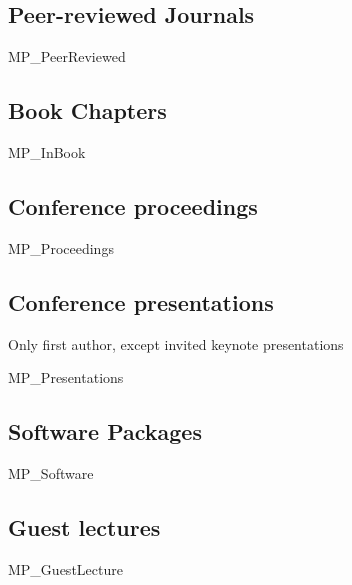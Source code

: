 \documentclass[a4paper]{article}
\begin{document}
\subsection{Peer-reviewed Journals}

\begin{btSect}{MP_PeerReviewed}
\btPrintAll
\end{btSect}


\subsection{Book Chapters}

\begin{btSect}{MP_InBook}
\btPrintAll
\end{btSect}


\subsection{Conference proceedings}

\begin{btSect}{MP_Proceedings}
\btPrintAll
\end{btSect}


\subsection{Conference presentations}

Only first author, except invited keynote presentations
\begin{btSect}{MP_Presentations}
\btPrintAll
\end{btSect}

\subsection{Software Packages}

\begin{btSect}{MP_Software}
\btPrintAll
\end{btSect}


\subsection{Guest lectures}

\begin{btSect}{MP_GuestLecture}
\btPrintAll
\end{btSect}
\end{document}
